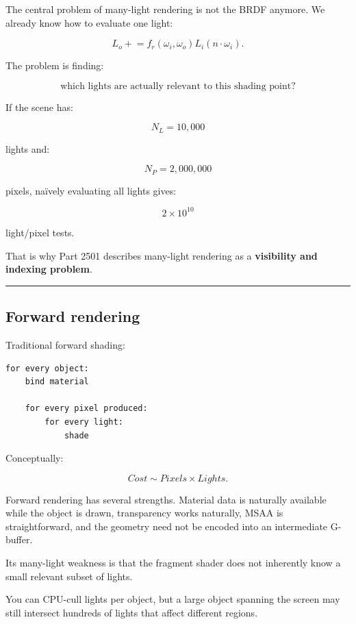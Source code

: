 The central problem of many-light rendering is not the BRDF anymore. We already know how to evaluate one light:

\[
L_o \mathrel{+}=
f_r(\omega_i,\omega_o)
L_i
(n\cdot\omega_i).
\]

The problem is finding:

\[
\boxed{
\text{which lights are actually relevant to this shading point?}
}
\]

If the scene has:

\[
N_L=10,000
\]

lights and:

\[
N_P=2,000,000
\]

pixels, naïvely evaluating all lights gives:

\[
2\times10^{10}
\]

light/pixel tests.

That is why Part 2501 describes many-light rendering as a \textbf{visibility and indexing problem}.

\begin{center}\rule{0.5\linewidth}{0.5pt}\end{center}

\subsection{Forward rendering}\label{04-visual-computing-ii-ch040-forward-rendering}

\hypertarget{04-visual-computing-ii-ch040-forward-rendering}{}

Traditional forward shading:

\begin{verbatim}
for every object:
    bind material

    for every pixel produced:
        for every light:
            shade
\end{verbatim}

Conceptually:

\[
Cost
\sim
Pixels\times Lights.
\]

Forward rendering has several strengths. Material data is naturally available while the object is drawn, transparency works naturally, MSAA is straightforward, and the geometry need not be encoded into an intermediate G-buffer.

Its many-light weakness is that the fragment shader does not inherently know a small relevant subset of lights.

You can CPU-cull lights per object, but a large object spanning the screen may still intersect hundreds of lights that affect different regions.

